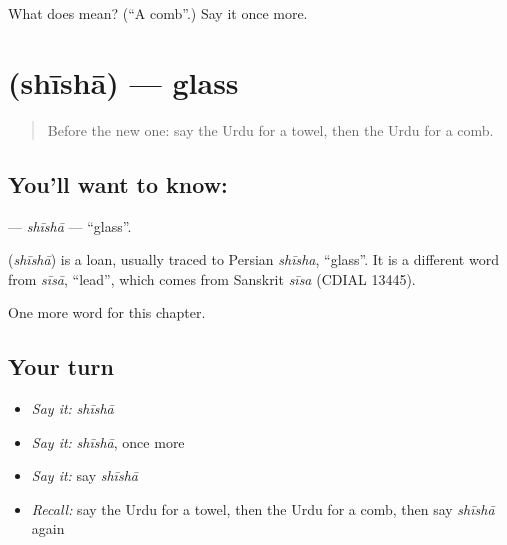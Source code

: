 \begin{tcolorbox}[breakable,colback=teal!4,colframe=teal!35!black,title={Before you move on}]
What does  mean? (\textquotedblleft{}A comb\textquotedblright{}.) Say it once more.
\end{tcolorbox}
\section[\texorpdfstring{\ur{شیشہ} (shīshā)}{شیشہ (shīshā)}]{ (shīshā) — glass}

\label{lesson:UR-C106-shisha}



\begin{quote}
Before the new one: say the Urdu for a towel, then the Urdu for a comb.
\end{quote}

\subsection*{You'll want to know: }
\textbf{} — \emph{shīshā} — \textquotedblleft{}glass\textquotedblright{}.

\begin{cousinweb}
\textbf{} (\emph{shīshā}) is a loan, usually traced to Persian \emph{shīsha}, \textquotedblleft{}glass\textquotedblright{}. It is a different word from \emph{sīsā}, \textquotedblleft{}lead\textquotedblright{}, which comes from Sanskrit \emph{sīsa} (CDIAL 13445).
\end{cousinweb}

\begin{grammarlens}[title={What you've built}]
One more word for this chapter.
\end{grammarlens}

\subsection*{Your turn}
\begin{itemize}
\raggedright
  \item \emph{Say it:} \emph{shīshā}
  \item \emph{Say it:} \emph{shīshā}, once more
  \item \emph{Say it:} say \emph{shīshā}
  \item \emph{Recall:} say the Urdu for a towel, then the Urdu for a comb, then say \emph{shīshā} again
\end{itemize}

